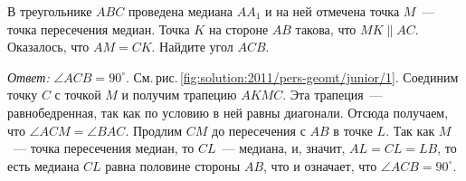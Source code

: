 \problem
В треугольнике $ABC$ проведена медиана $A A_1$ и на ней отмечена точка $M$~---
точка пересечения медиан.
Точка $K$ на стороне $AB$ такова, что $MK \parallel AC$.
Оказалось, что $AM = CK$.
Найдите угол $ACB$.

%
\label{solution:2011/pers-geomt/junior/1}%
\emph{Ответ:} $\angle ACB = 90^\circ$.
См.\,рис.\,\ref{fig:solution:2011/pers-geomt/junior/1}.
Соединим точку $C$ с точкой $M$ и получим трапецию $AKMC$.
Эта трапеция~--- равнобедренная, так как по условию в ней равны диагонали.
Отсюда получаем, что $\angle ACM = \angle BAC$.
Продлим $CM$ до пересечения с $AB$ в точке $L$.
Так как $M$~--- точка пересечения медиан, то $CL$~--- медиана, и, значит,
$AL = CL = LB$, то есть медиана $CL$ равна половине стороны $AB$, что и
означает, что $\angle ACB = 90^\circ$.

\endproblem
